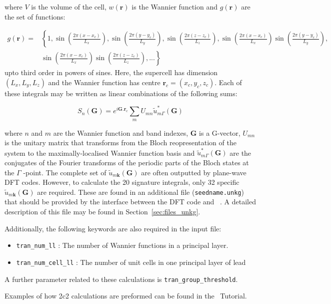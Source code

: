 where $V$ is the volume of the cell, $w(\mathbf{r})$ is the Wannier
function and $g(\mathbf{r})$ are the set of functions:

\begin{eqnarray}
g(\mathbf{r})=&\left\lbrace1,\sin\left(\frac{2\pi (x-x_c)}{L_x}\right),
											 \sin\left(\frac{2\pi (y-y_c)}{L_y}\right),
											 \sin\left(\frac{2\pi (z-z_c)}{L_z}\right),
											 \sin\left(\frac{2\pi (x-x_c)}{L_x}\right)
											 \sin\left(\frac{2\pi (y-y_c)}{L_y}\right),\right.\nonumber \\
										   &\left.\sin\left(\frac{2\pi (x-x_c)}{L_x}\right)
											 \sin\left(\frac{2\pi (z-z_c)}{L_z}\right),
											 ... \right\rbrace
\label{eq:g(r)}
\end{eqnarray}
upto third order in powers of sines. Here, the supercell has dimension
$(L_x,L_y,L_z)$ and the Wannier function has centre $\mathbf{r}_c=(x_c,y_c,z_c)$.
Each of these integrals may be written as linear combinations
of the following sums:

\begin{equation}
S_n(\mathbf{G})=\displaystyle{e^{i\mathbf{G.r}_{c}}\sum_{m}U_{mn}\tilde{u}_{m\Gamma}^{*}(\mathbf{G})}
\end{equation}

where $n$ and $m$ are the Wannier function and band indexes,
$\mathbf{G}$ is a G-vector, $U_{mn}$ is the unitary matrix that
transforms from the Bloch reopresentation of the system to the
maximally-localised Wannier function basis and
$\tilde{u}_{m\Gamma}^{*}(\mathbf{G})$ are the conjugates of the
Fourier transforms of the periodic parts of the Bloch states at the $\Gamma\!$
-point. The complete set of $\tilde{u}_{m\mathbf{k}}(\mathbf{G})$
are often outputted by plane-wave DFT codes. However, to calculate the 20
signature integrals, only 32 specific $\tilde{u}_{m\mathbf{k}}(\mathbf{G})$
are required. These are found in an additional file (\verb#seedname.unkg#)
that should be provided by the interface between the DFT code and \wannier\ .
A detailed description of this file may be found in Section~\ref{sec:files_unkg}.

Additionally, the following keywords are also required in the input file:
\begin{itemize}
\item \verb#tran_num_ll# : The number of Wannier functions in a
principal layer.
\item \verb#tran_num_cell_ll# : The number of unit cells in one
principal layer of lead
\end{itemize}

A further parameter related to these calculations is
\verb#tran_group_threshold#.

Examples of how 2c2 calculations are preformed can be found
in the \wannier\ Tutorial.
